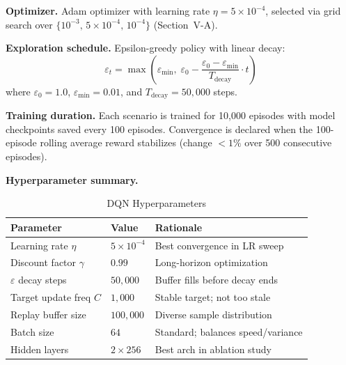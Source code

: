 \textbf{Optimizer.}
Adam optimizer with learning rate $\eta = 5 \times 10^{-4}$, selected via
grid search over $\{10^{-3},\,5 \times 10^{-4},\,10^{-4}\}$ (Section~V-A).

\textbf{Exploration schedule.}
Epsilon-greedy policy with linear decay:
\begin{equation}
    \varepsilon_t = \max\!\left(\varepsilon_{\min},\;
        \varepsilon_0 - \frac{\varepsilon_0 - \varepsilon_{\min}}{T_{\text{decay}}} \cdot t\right)
\end{equation}
where $\varepsilon_0 = 1.0$, $\varepsilon_{\min} = 0.01$, and
$T_{\text{decay}} = 50{,}000$ steps.

\textbf{Training duration.}
Each scenario is trained for 10,000 episodes with model checkpoints saved
every 100 episodes. Convergence is declared when the 100-episode rolling
average reward stabilizes (change $< 1\%$ over 500 consecutive episodes).

\textbf{Hyperparameter summary.}
\begin{table}[h]
\centering
\caption{DQN Hyperparameters}
\begin{tabular}{lll}
\hline
\textbf{Parameter} & \textbf{Value} & \textbf{Rationale} \\
\hline
Learning rate $\eta$          & $5 \times 10^{-4}$ & Best convergence in LR sweep \\
Discount factor $\gamma$      & $0.99$             & Long-horizon optimization \\
$\varepsilon$ decay steps     & $50{,}000$         & Buffer fills before decay ends \\
Target update freq $C$        & $1{,}000$          & Stable target; not too stale \\
Replay buffer size            & $100{,}000$        & Diverse sample distribution \\
Batch size                    & $64$               & Standard; balances speed/variance \\
Hidden layers                 & $2 \times 256$     & Best arch in ablation study \\
\hline
\end{tabular}
\label{tab:hyperparams}
\end{table}
